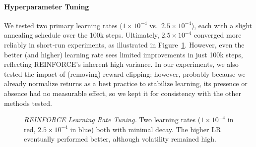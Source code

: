 \paragraph{Hyperparameter Tuning}
We tested two primary learning rates ($1\times10^{-4}$ vs.\ $2.5\times10^{-4}$), each with a slight annealing schedule over the 100k steps. 
Ultimately, $2.5\times10^{-4}$ converged more reliably in short‐run experiments, as illustrated in Figure~\ref{fig:reinforce_lr_tuning}. 
However, even the better (and higher) learning rate sees limited improvements in just 100k steps, reflecting REINFORCE’s inherent high variance.
In our experiments, we also tested the impact of (removing) reward clipping; however, probably because we already normalize returns as a best practice to stabilize learning, its presence or absence had no measurable effect, so we kept it for consistency with the other methods tested.
\begin{figure}
	\centering
	\quad
	\caption{\emph{REINFORCE Learning Rate Tuning.} Two learning rates ($1\times10^{-4}$ in red, $2.5\times10^{-4}$ in blue) 
		both with minimal decay. The higher LR eventually performed better, although volatility remained high.}
	\label{fig:reinforce_lr_tuning}
\end{figure}

